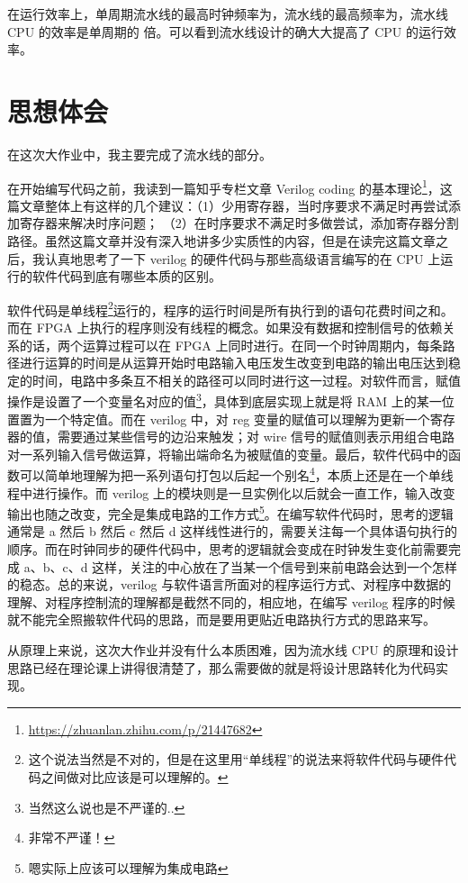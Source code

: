 \documentclass[a4paper]{article}
\begin{document}
在运行效率上，单周期流水线的最高时钟频率为，流水线的最高频率为，流水线 CPU 的效率是单周期的 倍。可以看到流水线设计的确大大提高了 CPU 的运行效率。

\section{思想体会}
\label{sec:思想体会}

在这次大作业中，我主要完成了流水线的部分。

在开始编写代码之前，我读到一篇知乎专栏文章 Verilog coding 的基本理论\footnote{\url{https://zhuanlan.zhihu.com/p/21447682}}，这篇文章整体上有这样的几个建议：（1）少用寄存器，当时序要求不满足时再尝试添加寄存器来解决时序问题； （2）在时序要求不满足时多做尝试，添加寄存器分割路径。虽然这篇文章并没有深入地讲多少实质性的内容，但是在读完这篇文章之后，我认真地思考了一下 verilog 的硬件代码与那些高级语言编写的在 CPU 上运行的软件代码到底有哪些本质的区别。

软件代码是单线程\footnote{这个说法当然是不对的，但是在这里用``单线程''的说法来将软件代码与硬件代码之间做对比应该是可以理解的。}运行的，程序的运行时间是所有执行到的语句花费时间之和。而在 FPGA 上执行的程序则没有线程的概念。如果没有数据和控制信号的依赖关系的话，两个运算过程可以在 FPGA 上同时进行。在同一个时钟周期内，每条路径进行运算的时间是从运算开始时电路输入电压发生改变到电路的输出电压达到稳定的时间，电路中多条互不相关的路径可以同时进行这一过程。对软件而言，赋值操作是设置了一个变量名对应的值\footnote{当然这么说也是不严谨的..}，具体到底层实现上就是将 RAM 上的某一位置置为一个特定值。而在 verilog 中，对 reg 变量的赋值可以理解为更新一个寄存器的值，需要通过某些信号的边沿来触发；对 wire 信号的赋值则表示用组合电路对一系列输入信号做运算，将输出端命名为被赋值的变量。最后，软件代码中的函数可以简单地理解为把一系列语句打包以后起一个别名\footnote{非常不严谨！}，本质上还是在一个单线程中进行操作。而 verilog 上的模块则是一旦实例化以后就会一直工作，输入改变输出也随之改变，完全是集成电路的工作方式\footnote{嗯实际上应该可以理解为集成电路}。在编写软件代码时，思考的逻辑通常是 a 然后 b 然后 c 然后 d 这样线性进行的，需要关注每一个具体语句执行的顺序。而在时钟同步的硬件代码中，思考的逻辑就会变成在时钟发生变化前需要完成 a、b、c、d 这样，关注的中心放在了当某一个信号到来前电路会达到一个怎样的稳态。总的来说，verilog 与软件语言所面对的程序运行方式、对程序中数据的理解、对程序控制流的理解都是截然不同的，相应地，在编写 verilog 程序的时候就不能完全照搬软件代码的思路，而是要用更贴近电路执行方式的思路来写。

从原理上来说，这次大作业并没有什么本质困难，因为流水线 CPU 的原理和设计思路已经在理论课上讲得很清楚了，那么需要做的就是将设计思路转化为代码实现。
\end{document}
